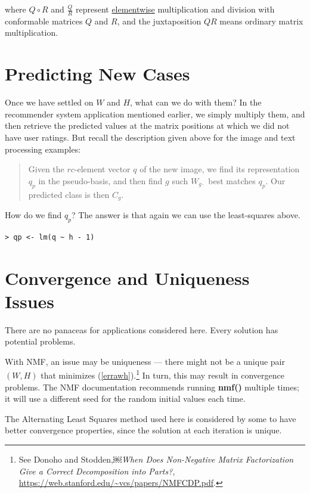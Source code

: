 where $Q \circ R$ and $\frac{Q}{R}$ represent \underline{elementwise}
multiplication and division with conformable matrices $Q$ and $R$, and
the juxtaposition $QR$ means ordinary matrix multiplication.

\section{Predicting New Cases}

Once we have settled on $W$ and $H$, what can we do with them?  In the
recommender system application mentioned earlier, we simply multiply
them, and then retrieve the predicted values at the matrix positions at
which we did not have user ratings.  But recall the description given
above for the image and text processing examples: 

\begin{quote}
Given the $rc$-element vector $q$ of the new image, we find
its representation $q_p$ in the pseudo-basis, and then find $g$ such
$W_{g \cdot}$ best matches $q_p$.  Our predicted class is then $C_g$.
\end{quote}

How do we find $q_p$?  The answer is that again we can use the
least-squares above.

\begin{lstlisting}
> qp <- lm(q ~ h - 1)
\end{lstlisting}

\section{Convergence and Uniqueness Issues}

There are no panaceas for applications considered here.  Every solution
has potential problems.

With NMF, an issue may be uniqueness --- there might not be a unique
pair $(W,H)$ that minimizes (\ref{errawh}).\footnote{See Donoho and
Stodden,￼{\it When Does Non-Negative Matrix Factorization Give a Correct
Decomposition into Parts?},
\url{https://web.stanford.edu/~vcs/papers/NMFCDP.pdf}.  } In turn, this
may result in convergence problems. The NMF documentation recommends
running {\bf nmf()} multiple times; it will use a different seed for the
random initial values each time.

The Alternating Least Squares method used here is considered by some to
have better convergence properties, since the solution at each iteration
is unique.  

